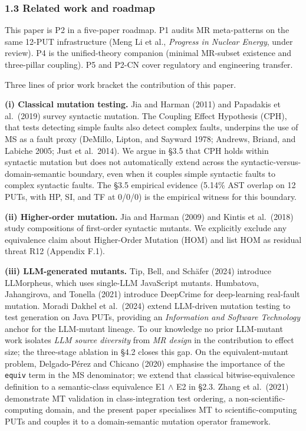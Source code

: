 \documentclass[review,12pt,authoryear]{elsarticle}
\begin{document}
\subsubsection{1.3 Related work and
roadmap}\label{related-work-and-roadmap}

This paper is P2 in a five-paper roadmap. P1 audits MR meta-patterns on
the same 12-PUT infrastructure (Meng Li et al., \emph{Progress in
Nuclear Energy}, under review). P4 is the unified-theory companion
(minimal MR-subset existence and three-pillar coupling). P5 and P2-CN
cover regulatory and engineering transfer.

Three lines of prior work bracket the contribution of this paper.

\textbf{(i) Classical mutation testing.} Jia and Harman (2011) and
Papadakis et al.~(2019) survey syntactic mutation. The Coupling Effect
Hypothesis (CPH), that tests detecting simple faults also detect complex
faults, underpins the use of MS as a fault proxy (DeMillo, Lipton, and
Sayward 1978; Andrews, Briand, and Labiche 2005; Just et al.~2014). We
argue in §3.5 that CPH holds within syntactic mutation but does not
automatically extend across the syntactic-versus-domain-semantic
boundary, even when it couples simple syntactic faults to complex
syntactic faults. The §3.5 empirical evidence (5.14\% AST overlap on 12
PUTs, with HP, SI, and TF at 0/0/0) is the empirical witness for this
boundary.

\textbf{(ii) Higher-order mutation.} Jia and Harman (2009) and Kintis et
al.~(2018) study compositions of first-order syntactic mutants. We
explicitly exclude any equivalence claim about Higher-Order Mutation
(HOM) and list HOM as residual threat R12 (Appendix F.1).

\textbf{(iii) LLM-generated mutants.} Tip, Bell, and Schäfer (2024)
introduce LLMorpheus, which uses single-LLM JavaScript mutants.
Humbatova, Jahangirova, and Tonella (2021) introduce DeepCrime for
deep-learning real-fault mutation. Moradi Dakhel et al.~(2024) extend
LLM-driven mutation testing to test generation on Java PUTs, providing
an \emph{Information and Software Technology} anchor for the LLM-mutant
lineage. To our knowledge no prior LLM-mutant work isolates \emph{LLM
source diversity} from \emph{MR design} in the contribution to effect
size; the three-stage ablation in §4.2 closes this gap. On the
equivalent-mutant problem, Delgado-Pérez and Chicano (2020) emphasise
the importance of the \texttt{equiv} term in the MS denominator; we
extend that classical bitwise-equivalence definition to a semantic-class
equivalence E1 $\wedge$ E2 in §2.3. Zhang et al.~(2021) demonstrate MT
validation in class-integration test ordering, a
non-scientific-computing domain, and the present paper specialises MT to
scientific-computing PUTs and couples it to a domain-semantic mutation
operator framework.
\end{document}

